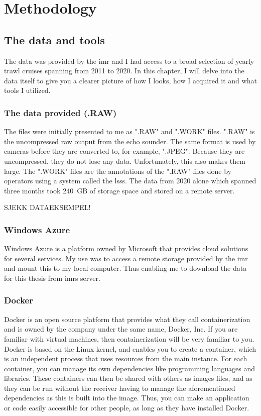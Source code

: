\chapter{Methodology}
\section{The data and tools}
    The data was provided by the \gls{imr} and I had access to a broad selection of yearly trawl cruises spanning from 2011 to 2020. In this chapter, I will delve into the data itself to give you a clearer picture of how I looks, how I acquired it and what tools I utilized.
    
    \subsection{The data provided (.RAW)}
        The files were initially presented to me as ".RAW" \cite{raw} and ".WORK" files. ".RAW" is the uncompressed raw output from the echo sounder. The same format is used by cameras before they are converted to, for example, ".JPEG". Because they are uncompressed, they do not lose any data. Unfortunately, this also makes them large. The ".WORK" files are the annotations of the ".RAW" files done by operators using a system called the \Gls{lsss}\cite{lsss}. The data from 2020 alone which spanned three months took 240 GB of storage space and stored on a remote server.
        
        SJEKK DATAEKSEMPEL!
    \subsection{Windows Azure}
        Windows Azure \cite{azure} is a platform owned by Microsoft that provides cloud solutions for several services. My use was to access a remote storage provided by the \gls{imr} and mount this to my local computer. Thus enabling me to download the data for this thesis from \gls{imr}s server. 
    
    \subsection{Docker}
        Docker \cite{docker} is an open source platform that provides what they call containerization and is owned by the company under the same name, Docker, Inc. If you are familiar with virtual machines, then containerization will be very familiar to you. Docker is based on the Linux kernel, and enables you to create a container, which is an independent process that uses resources from the main instance. For each container, you can manage its own dependencies like programming languages and libraries. These containers can then be shared with others as images files, and as they can be run without the receiver having to manage the aforementioned dependencies as this is built into the image. Thus, you can make an application or code easily accessible for other people, as long as they have installed Docker.
        
